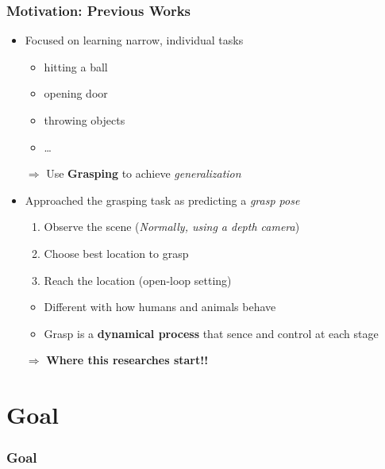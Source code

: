 \documentclass{beamer}
\newcommand{\firstSec}{Motivation}
\newcommand{\secondSec}{Goal}
\begin{document}
    \begin{frame}
      \frametitle{\firstSec : Previous Works}
      \begin{itemize}
        \item Focused on learning narrow, individual tasks
        \begin{itemize}
          \item hitting a ball
          \item opening door
          \item throwing objects
          \item \ldots
        \end{itemize}
        \pause
      \end{itemize}
      \begin{itemize}
        \setlength{\itemindent}{.3in}
        \item[$\Rightarrow$] Use \textbf{Grasping} to achieve \textit{generalization}
      \end{itemize}
      \pause
      \begin{itemize}
        \item Approached the grasping task as predicting a \textit{grasp pose}
        \begin{enumerate}
          \item Observe the scene (\textit{Normally, using a depth camera})
          \item Choose best location to grasp
          \item Reach the location (open-loop setting)
        \end{enumerate}
        \pause
        \begin{itemize}
          \item Different with how humans and animals behave
          \item Grasp is a \textbf{dynamical process} that sence and control at each stage
        \end{itemize}
      \end{itemize}
      \pause
      \begin{itemize}
        \setlength{\itemindent}{.3in}
        \item[$\Rightarrow$] \textbf{Where this researches start!!}
      \end{itemize}
    \end{frame}


  \section{\secondSec}
  \begin{frame}
    \frametitle{\secondSec}
    
  \end{frame}
\end{document}
